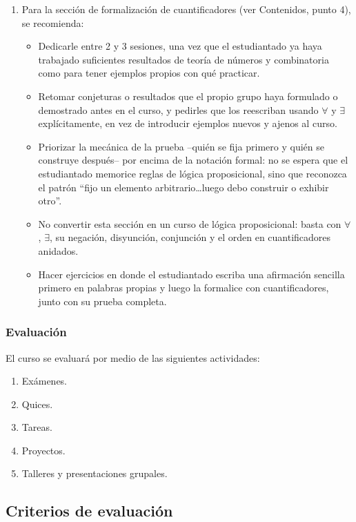 \begin{refsection}
\begin{enumerate}
    \item Para la sección de formalización de cuantificadores (ver
  Contenidos, punto 4), se recomienda:
  \begin{itemize}
    \item Dedicarle entre 2 y 3 sesiones, una vez que el estudiantado
      ya haya trabajado suficientes resultados de teoría de números
      y combinatoria como para tener ejemplos propios con qué
      practicar.
    \item Retomar conjeturas o resultados que el propio grupo haya
      formulado o demostrado antes en el curso, y pedirles que los
      reescriban usando $\forall$ y $\exists$ explícitamente, en vez
      de introducir ejemplos nuevos y ajenos al curso.
    \item Priorizar la mecánica de la prueba --quién se fija primero
      y quién se construye después-- por encima de la notación
      formal: no se espera que el estudiantado memorice reglas de
      lógica proposicional, sino que reconozca el patrón ``fijo un
      elemento arbitrario\ldots luego debo construir o exhibir
      otro''.
    \item No convertir esta sección en un curso de lógica proposicional: basta con
      $\forall$, $\exists$, su negación, disyunción, conjunción y el orden en cuantificadores
      anidados.
    \item Hacer ejercicios en donde el estudiantado escriba una afirmación sencilla primero en palabras propias y luego la
      formalice con cuantificadores, junto con su prueba completa.
  \end{itemize}
    
\end{enumerate}

\subsubsection*{Evaluación}

El curso se evaluará por medio de las siguientes actividades:

\begin{enumerate}
\item Exámenes.
\item Quices.
\item Tareas.
\item Proyectos.
\item Talleres y presentaciones grupales.
\end{enumerate}

\subsection*{Criterios de evaluación}


\end{refsection}
